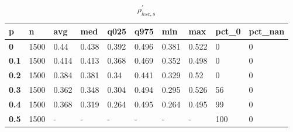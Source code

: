 \begin{table}[h]
 \centering 
\footnotesize
\caption{$\rho_{hsc,s}^\prime $}
\label{tab:alphahscs}
\begin{tabular}[h]{|l|l|l|l|l|l|l|l|l|l|
    } \hline
\textbf{ p} & \textbf{ n} & \textbf{ avg} & \textbf{ med} & \textbf{ q025} & \textbf{ q975} & \textbf{ min} & \textbf{ max} & \textbf{ pct\_0} & \textbf{ pct\_nan}
    \\ \hline
  \textbf{  0} & 1500 &  0.44 & 0.438 & 0.392 & 0.496 & 0.381 & 0.522 &   0 & 0
    \\ \hline
  \textbf{0.1} & 1500 & 0.414 & 0.413 & 0.368 & 0.469 & 0.352 & 0.498 &   0 & 0
    \\ \hline
  \textbf{0.2} & 1500 & 0.384 & 0.381 &  0.34 & 0.441 & 0.329 &  0.52 &   0 & 0
    \\ \hline
  \textbf{0.3} & 1500 & 0.362 & 0.348 & 0.304 & 0.494 & 0.295 & 0.526 &  56 & 0
    \\ \hline
  \textbf{0.4} & 1500 & 0.368 & 0.319 & 0.264 & 0.495 & 0.264 & 0.495 &  99 & 0
    \\ \hline
  \textbf{0.5} & 1500 & - & - & - & - & - & - & 100 & 0
    \\ \hline
 \end{tabular}
 \end{table}
